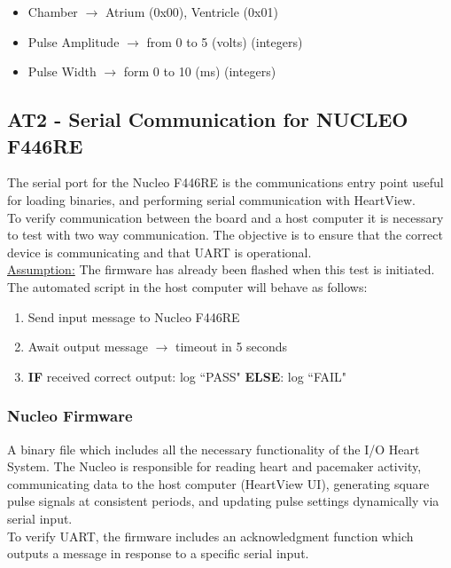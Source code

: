 \documentclass[]{article}
\begin{document}
\begin{itemize}
	\item Chamber $\rightarrow$ Atrium (0x00), Ventricle (0x01)
	\item Pulse Amplitude $\rightarrow$ from 0 to 5 (volts) (integers)
	\item Pulse Width $\rightarrow$ form 0 to 10 (ms) (integers)
\end{itemize}

\subsection{AT2 - Serial Communication for NUCLEO F446RE}

The serial port for the Nucleo F446RE is the communications entry point useful for loading binaries, and performing serial communication with HeartView.\\

To verify communication between the board and a host computer it is necessary to test with two way communication. The objective is to ensure that the correct device is communicating and that UART is operational. \\

\underline{Assumption:} The firmware has already been flashed when this test is initiated.\\

The automated script in the host computer will behave as follows:
\begin{enumerate}
	\item Send input message to Nucleo F446RE
	\item Await output message $\rightarrow$ timeout in 5 seconds
	\item \textbf{IF} received correct output: log ``PASS" \textbf{ELSE}: log ``FAIL"
\end{enumerate}

\subsubsection{Nucleo Firmware}
A binary file which includes all the necessary functionality of the I/O Heart System. The Nucleo is responsible for reading heart and pacemaker activity, communicating data to the host computer (HeartView UI), generating square pulse signals at consistent periods, and updating pulse settings dynamically via serial input.\\

To verify UART, the firmware includes an acknowledgment function which outputs a message in response to a specific serial input.\\
\end{document}
